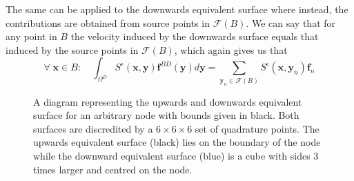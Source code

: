 The same can be applied to the downwards equivalent surface where instead, the contributions are obtained from source points in $\mathcal{F}(B)$. We can say that for any point in $B$ the velocity induced by the downwards surface equals that induced by the source points in $\mathcal{F}(B)$, which again gives us that
\begin{equation}
\label{eq:downsurfint}
    \forall \;\bm{x} \in B: \quad \int_{\Omega^D} S^\epsilon(\bm{x}, \bm{y}) \bm{f}^{BD}(\bm{y}) d \bm{y}=\sum_{{\bm{y}}_n \in \mathcal{F}(B)} S^\epsilon\left(\bm{x}, {\bm{y}}_n\right) {\bm{f}}_{n}
\end{equation}

\begin{figure}[ht]
    \centering
    \resizebox{.6\linewidth}{!}{}
    \caption[A diagram representing the upwards and downwards equivalent surface for an arbitrary node with bounds given in black.]{A diagram representing the upwards and downwards equivalent surface for an arbitrary node with bounds given in black. Both surfaces are discredited by a $6 \times 6 \times 6$ set of quadrature points. The upwards equivalent surface (black) lies on the boundary of the node while the downward equivalent surface (blue) is a cube with sides 3 times larger and centred on the node. }
    \label{fig:UpandDownsurf}
\end{figure}

